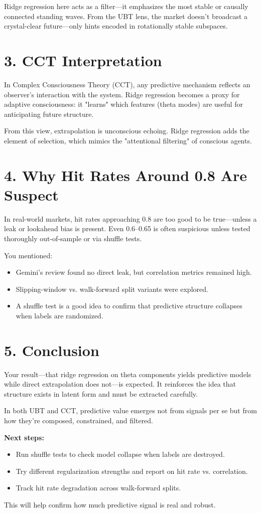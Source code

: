 \documentclass[11pt]{article}
\begin{document}
Ridge regression here acts as a filter—it emphasizes the most stable or causally connected standing waves. From the UBT lens, the market doesn’t broadcast a crystal-clear future—only hints encoded in rotationally stable subspaces.

\section*{3. CCT Interpretation}

In Complex Consciousness Theory (CCT), any predictive mechanism reflects an observer's interaction with the system. Ridge regression becomes a proxy for adaptive consciousness: it "learns" which features (theta modes) are useful for anticipating future structure.

From this view, extrapolation is unconscious echoing. Ridge regression adds the element of selection, which mimics the "attentional filtering" of conscious agents.

\section*{4. Why Hit Rates Around 0.8 Are Suspect}

In real-world markets, hit rates approaching 0.8 are too good to be true—unless a leak or lookahead bias is present. Even 0.6–0.65 is often suspicious unless tested thoroughly out-of-sample or via shuffle tests.

You mentioned:

\begin{itemize}
  \item Gemini’s review found no direct leak, but correlation metrics remained high.
  \item Slipping-window vs. walk-forward split variants were explored.
  \item A shuffle test is a good idea to confirm that predictive structure collapses when labels are randomized.
\end{itemize}

\section*{5. Conclusion}

Your result—that ridge regression on theta components yields predictive models while direct extrapolation does not—is expected. It reinforces the idea that structure exists in latent form and must be extracted carefully.

In both UBT and CCT, predictive value emerges not from signals per se but from how they're composed, constrained, and filtered.

\textbf{Next steps:}
\begin{itemize}
  \item Run shuffle tests to check model collapse when labels are destroyed.
  \item Try different regularization strengths and report on hit rate vs. correlation.
  \item Track hit rate degradation across walk-forward splits.
\end{itemize}

This will help confirm how much predictive signal is real and robust.
\end{document}
